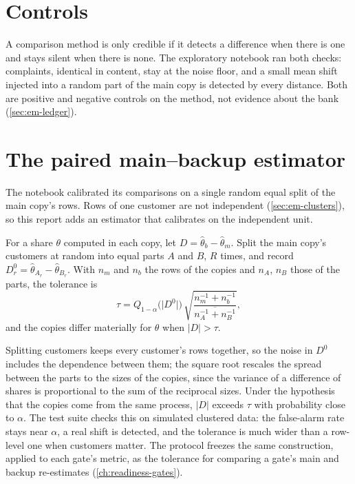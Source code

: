 \section{Controls}\label{sec:eq-controls}

A comparison method is only credible if it detects a difference when there is one and stays silent when there is
none. The exploratory notebook ran both checks: complaints, identical in content, stay at the noise floor, and a small
mean shift injected into a random part of the main copy is detected by every distance. Both are positive and negative
controls on the method, not evidence about the bank (\cref{sec:em-ledger}).

\section{The paired main--backup estimator}\label{sec:eq-paired}

The notebook calibrated its comparisons on a single random equal split of the main copy's rows. Rows of one
customer are not independent (\cref{sec:em-clusters}), so this report adds an estimator that calibrates on the
independent unit.

\begin{definition}\label{def:paired}
For a share $\theta$ computed in each copy, let $D = \hat\theta_b - \hat\theta_m$. Split the main copy's customers at
random into equal parts $A$ and $B$, $R$ times, and record $D^{0}_r = \hat\theta_{A_r} - \hat\theta_{B_r}$. With $n_m$ and $n_b$
the rows of the copies and $n_{A}$, $n_{B}$ those of the parts, the tolerance is
\begin{equation}\label{eq:paired-tol}
  \tau = Q_{1-\alpha}\bigl(\lvert D^{0} \rvert\bigr)\,
  \sqrt{\frac{n_m^{-1} + n_b^{-1}}{\overline{n_A^{-1} + n_B^{-1}}}},
\end{equation}
and the copies differ materially for $\theta$ when $\lvert D \rvert > \tau$.
\end{definition}

Splitting customers keeps every customer's rows together, so the noise in $D^{0}$ includes the dependence between
them; the square root rescales the spread between the parts to the sizes of the copies, since the variance of a
difference of shares is proportional to the sum of the reciprocal sizes. Under the hypothesis that the copies come
from the same process, $\lvert D \rvert$ exceeds $\tau$ with probability close to $\alpha$. The test suite checks this
on simulated clustered data: the false-alarm rate stays near $\alpha$, a real shift is detected, and the tolerance is
much wider than a row-level one when customers matter. The protocol freezes the same construction, applied to each
gate's metric, as the tolerance for comparing a gate's main and backup re-estimates (\cref{ch:readiness-gates}).

